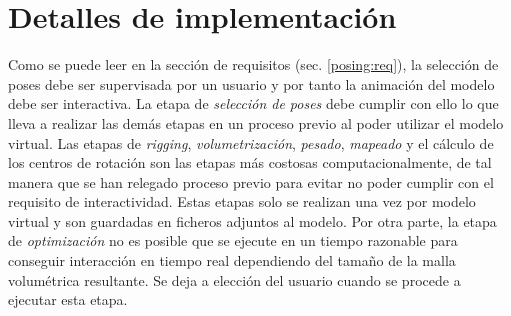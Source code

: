 \section{Detalles de implementación}
\label{posing:preprocess}

Como se puede leer en la sección de requisitos (sec. \ref{posing:req}), la selección de poses debe ser supervisada por un usuario y por tanto la animación del modelo debe ser interactiva. La etapa de \emph{selección de poses} debe cumplir con ello lo que lleva a realizar las demás etapas en un proceso previo al poder utilizar el modelo virtual. Las etapas de \emph{rigging}, \emph{volumetrización}, \emph{pesado}, \emph{mapeado} y el cálculo de los centros de rotación son las etapas más costosas computacionalmente, de tal manera que se han relegado  proceso previo para evitar no poder cumplir con el requisito de interactividad. Estas etapas solo se realizan una vez por modelo virtual y son guardadas en ficheros adjuntos al modelo. 
Por otra parte, la etapa de \emph{optimización} no es posible que se ejecute en un tiempo razonable para conseguir interacción en tiempo real dependiendo del tamaño de la malla volumétrica resultante. Se deja a elección del usuario cuando se procede a ejecutar esta etapa.


